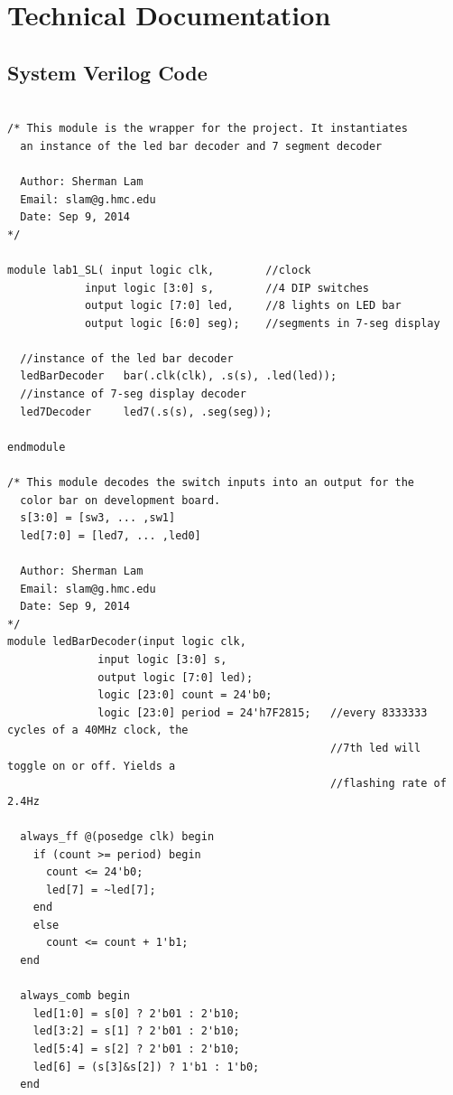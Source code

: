 \documentclass[11pt]{article}
\begin{document}
\clearpage


\section{Technical Documentation}

\subsection{System Verilog Code}

\small\begin{verbatim}

/* This module is the wrapper for the project. It instantiates
  an instance of the led bar decoder and 7 segment decoder
  
  Author: Sherman Lam
  Email: slam@g.hmc.edu
  Date: Sep 9, 2014
*/

module lab1_SL( input logic clk,        //clock
            input logic [3:0] s,        //4 DIP switches
            output logic [7:0] led,     //8 lights on LED bar
            output logic [6:0] seg);    //segments in 7-seg display
  
  //instance of the led bar decoder
  ledBarDecoder   bar(.clk(clk), .s(s), .led(led));   
  //instance of 7-seg display decoder
  led7Decoder     led7(.s(s), .seg(seg)); 

endmodule

/* This module decodes the switch inputs into an output for the 
  color bar on development board.
  s[3:0] = [sw3, ... ,sw1]
  led[7:0] = [led7, ... ,led0]
  
  Author: Sherman Lam
  Email: slam@g.hmc.edu
  Date: Sep 9, 2014
*/
module ledBarDecoder(input logic clk,
              input logic [3:0] s,
              output logic [7:0] led);
              logic [23:0] count = 24'b0;
              logic [23:0] period = 24'h7F2815;   //every 8333333 cycles of a 40MHz clock, the
                          	                      //7th led will toggle on or off. Yields a 
                          	                      //flashing rate of 2.4Hz
  
  always_ff @(posedge clk) begin
    if (count >= period) begin
      count <= 24'b0;
      led[7] = ~led[7];
    end
    else            
      count <= count + 1'b1;
  end
  
  always_comb begin
    led[1:0] = s[0] ? 2'b01 : 2'b10;
    led[3:2] = s[1] ? 2'b01 : 2'b10;
    led[5:4] = s[2] ? 2'b01 : 2'b10;
    led[6] = (s[3]&s[2]) ? 1'b1 : 1'b0;
  end


\end{verbatim}
\end{document}
